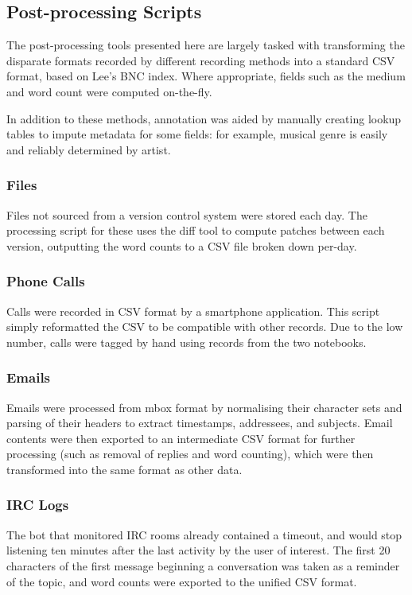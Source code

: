 

\subsection{Post-processing Scripts}
The post-processing tools presented here are largely tasked with transforming the disparate formats recorded by different recording methods into a standard CSV format, based on Lee's BNC index.  Where appropriate, fields such as the medium and word count were computed on-the-fly.

In addition to these methods, annotation was aided by manually creating lookup tables to impute metadata for some fields: for example, musical genre is easily and reliably determined by artist.


\subsubsection*{Files}

Files not sourced from a version control system were stored each day.  The processing script for these uses the diff tool to compute patches between each version, outputting the word counts to a CSV file broken down per-day.

\subsubsection*{Phone Calls}
Calls were recorded in CSV format by a smartphone application.  This script simply reformatted the CSV to be compatible with other records.  Due to the low number, calls were tagged by hand using records from the two notebooks.


\subsubsection*{Emails}
Emails were processed from mbox format by normalising their character sets and parsing of their headers to extract timestamps, addressees, and subjects.  Email contents were then exported to an intermediate CSV format for further processing (such as removal of replies and word counting), which were then transformed into the same format as other data.



\subsubsection*{IRC Logs}
The bot that monitored IRC rooms already contained a timeout, and would stop listening ten minutes after the last activity by the user of interest.  The first 20 characters of the first message beginning a conversation was taken as a reminder of the topic, and word counts were exported to the unified CSV format.


